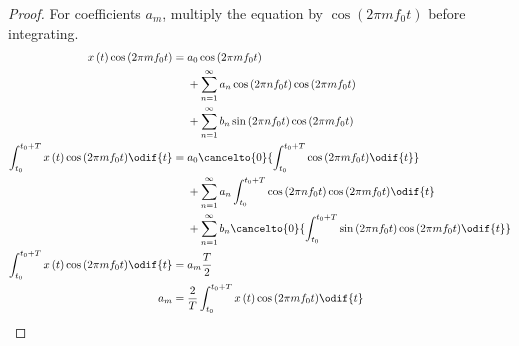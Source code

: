 \documentclass{article}
\begin{document}
\begin{proof}
    For coefficients \(a_m\), multiply the equation by \(\cos{\left( 2
    \pi m f_0 t \right)}\) before integrating.
    \begin{align*}
        x\left( t \right) \cos{\left( 2 \pi m f_0 t \right)}                               & =
                                                                                               \begin{aligned}[t]
                                                                                                    & a_0 \cos{\left( 2 \pi m f_0 t \right)}                                                          \\
                                                                                                    & + \sum_{n = 1}^\infty a_n \cos{\left( 2 \pi n f_0 t \right)} \cos{\left( 2 \pi m f_0 t \right)} \\
                                                                                                    & + \sum_{n = 1}^\infty b_n \sin{\left( 2 \pi n f_0 t \right)} \cos{\left( 2 \pi m f_0 t \right)}
                                                                                               \end{aligned}
        \\
        \int_{t_0}^{t_0 + T} x\left( t \right) \cos{\left( 2 \pi m f_0 t \right)} \odif{t} & =
                                                                                               \begin{aligned}[t]
                                                                                                    & a_0 \cancelto{0}{\int_{t_0}^{t_0 + T} \cos{\left( 2 \pi m f_0 t \right)} \odif{t}}                                                          \\
                                                                                                    & + \sum_{n = 1}^\infty a_n \int_{t_0}^{t_0 + T} \cos{\left( 2 \pi n f_0 t \right)} \cos{\left( 2 \pi m f_0 t \right)} \odif{t}               \\
                                                                                                    & + \sum_{n = 1}^\infty b_n \cancelto{0}{\int_{t_0}^{t_0 + T} \sin{\left( 2 \pi n f_0 t \right)} \cos{\left( 2 \pi m f_0 t \right)} \odif{t}}
                                                                                               \end{aligned}
        \\
        \int_{t_0}^{t_0 + T} x\left( t \right) \cos{\left( 2 \pi m f_0 t \right)} \odif{t} & = a_m \frac{T}{2}                                                                                                                                       \\
        a_m                                                                                & = \frac{2}{T} \int_{t_0}^{t_0 + T} x\left( t \right) \cos{\left( 2 \pi m f_0 t \right)} \odif{t}
    \end{align*}


\end{proof}
\end{document}

